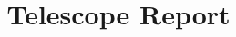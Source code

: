 \documentclass[twocolumn,secnumarabic,aps,superscriptaddress,floatfix,nofootinbib,showpacs,amsmath,amssymb,altaffilletter,floatfix]{revtex4-1}
\begin{document}
\title{Telescope Report}

\setlength{\parindent}{1em}
\setdefaultleftmargin{1em}{1em}{}{}{}{}
\maketitle
\bigbreak







\onecolumngrid

\end{document}
